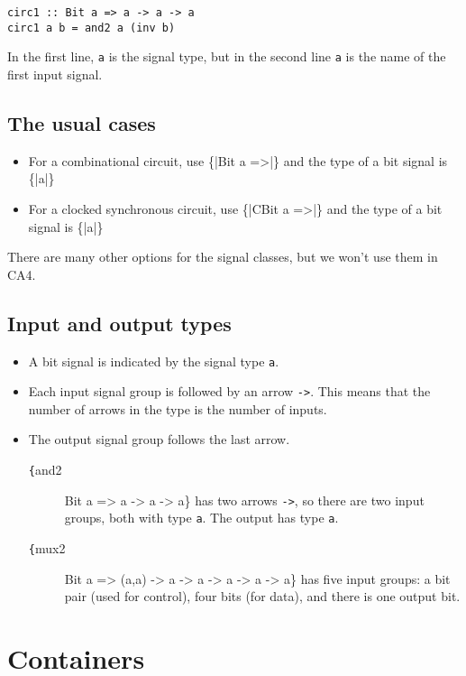 \documentclass[11pt]{article}
\begin{document}
\begin{verbatim}
circ1 :: Bit a => a -> a -> a
circ1 a b = and2 a (inv b)
\end{verbatim}

In the first line, \texttt{a} is the signal type, but in the second
line \texttt{a} is the name of the first input signal.

\subsection{The usual cases}
\label{sec:org2c8988a}

\begin{itemize}
\item For a combinational circuit, use \{\color{red}|Bit a =>|\} and the
type of a bit signal is \{\color{red}|a|\}
\item For a clocked synchronous circuit, use \{\color{red}|CBit a =>|\}
and the type of a bit signal is \{\color{red}|a|\}
\end{itemize}

There are many other options for the signal classes, but we won't use
them in CA4.

\subsection{Input and output types}
\label{sec:orgf8ec136}

\begin{itemize}
\item A bit signal is indicated by the signal type \texttt{a}.
\item Each input signal group is followed by an arrow \texttt{->}.
This means that the number of arrows in the type is the number of
inputs.
\item The output signal group follows the last arrow.

\begin{description}
\item[{\texttt\{and2}] Bit a => a -> a -> a\} has two arrows
\texttt{->}, so there are two input groups, both with type
\texttt{a}.  The output has type \texttt{a}.
\item[{\texttt\{mux2}] Bit a => (a,a) -> a -> a -> a -> a -> a\}
has five input groups: a bit pair (used for control), four bits
(for data), and there is one output bit.
\end{description}
\end{itemize}


\section{Containers}
\label{sec:org2ea9607}
\end{document}
